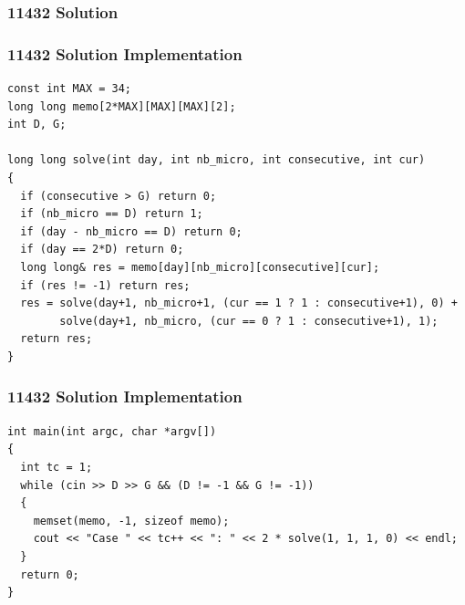 \documentclass{beamer}
\newcommand{\uvalink}[2]{UVa Online Judge (http://uva.onlinejudge.org)
  problem number \href{#2}{\textcolor{blue}{#1}.}}
\newcounter{exo}
\newcommand{\exo}{
  \addtocounter{exo}{1}
  Exercice \arabic{exo}
}
\begin{document}
\fi


\ifanswers

\begin{frame}%
\frametitle{11432 Solution}

\end{frame}

\begin{frame}[fragile]
\frametitle{11432 Solution Implementation}

\scriptsize
\begin{lstlisting}
const int MAX = 34;
long long memo[2*MAX][MAX][MAX][2];
int D, G;

long long solve(int day, int nb_micro, int consecutive, int cur)
{
  if (consecutive > G) return 0;
  if (nb_micro == D) return 1;
  if (day - nb_micro == D) return 0;
  if (day == 2*D) return 0;
  long long& res = memo[day][nb_micro][consecutive][cur];
  if (res != -1) return res;
  res = solve(day+1, nb_micro+1, (cur == 1 ? 1 : consecutive+1), 0) +
        solve(day+1, nb_micro, (cur == 0 ? 1 : consecutive+1), 1);
  return res;
}
\end{lstlisting}

\end{frame}

\begin{frame}[fragile]
\frametitle{11432 Solution Implementation}

\scriptsize
\begin{lstlisting}
int main(int argc, char *argv[])
{
  int tc = 1;
  while (cin >> D >> G && (D != -1 && G != -1))
  {
    memset(memo, -1, sizeof memo);
    cout << "Case " << tc++ << ": " << 2 * solve(1, 1, 1, 0) << endl;
  }
  return 0;
}
\end{lstlisting}

\end{frame}

\fi

\end{document}
